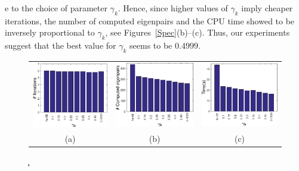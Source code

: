 e to the choice of parameter $\gamma_k$. Hence, since higher values of $\gamma_k$ imply cheaper iterations, the number of computed eigenpairs and the CPU time showed to be inversely proportional to $\gamma_k$, see Figures~\ref{Spec}(b)--(c). Thus, our experiments suggest that the best value for $\gamma_k$ seems to be $0.4999$.

\begin{figure}[H]\centering
	\begin{tabular}{ccc}
		\includegraphics[scale=\myscale]{figures/Specit} & \includegraphics[scale=\myscale]{figures/SpecFWIT} & \includegraphics[scale=\myscale]{figures/Spectime} \\
		(a) & (b) & (c)\\
	\end{tabular}
	\c
\end{figure}
